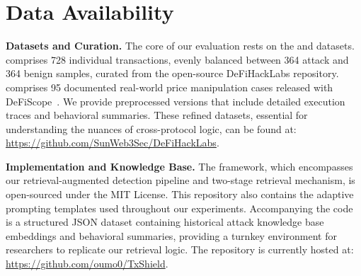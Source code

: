 \section{Data Availability}


\textbf{Datasets and Curation.} The core of our evaluation rests on the \dsystem{} and \done{} datasets. \dsystem{} comprises 728 individual transactions, evenly balanced between 364 attack and 364 benign samples, curated from the open-source DeFiHackLabs repository. \done{} comprises 95 documented real-world price manipulation cases released with DeFiScope~\cite{zhong2025detectingvariousdefiprice}. We provide preprocessed versions that include detailed execution traces and behavioral summaries. These refined datasets, essential for understanding the nuances of cross-protocol logic, can be found at: \url{https://github.com/SunWeb3Sec/DeFiHackLabs}.


\textbf{Implementation and Knowledge Base.} The \approach{} framework, which encompasses our retrieval-augmented detection pipeline and two-stage retrieval mechanism, is open-sourced under the MIT License. This repository also contains the adaptive prompting templates used throughout our experiments. Accompanying the code is a structured JSON dataset containing historical attack knowledge base embeddings and behavioral summaries, providing a turnkey environment for researchers to replicate our retrieval logic. The repository is currently hosted at:  \url{https://github.com/oumo0/TxShield}.




